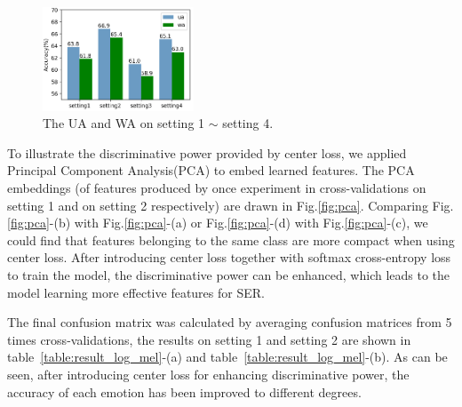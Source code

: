 \documentclass{article}
\begin{document}
\begin{figure}[htb]
	\begin{minipage}[c]{0.55\linewidth}
		\centerline{\includegraphics[width=4.5cm]{fig6}}
	\end{minipage}
	\begin{minipage}[c]{0.36\linewidth}
	\end{minipage}
	\caption{The UA and WA on setting 1 $\sim$ setting 4.}
	\label{fig:setting1-4}

\end{figure}

To illustrate the discriminative power provided by center loss, we applied Principal Component Analysis({PCA}) to embed learned features. The PCA embeddings (of features produced by once experiment in cross-validations on setting 1 and on setting 2 respectively) are drawn in Fig.\ref{fig:pca}. Comparing Fig.\ref{fig:pca}-(b) with Fig.\ref{fig:pca}-(a) or Fig.\ref{fig:pca}-(d) with Fig.\ref{fig:pca}-(c), we could find that features belonging to the same class are more compact when using center loss. After introducing center loss together with softmax cross-entropy loss to train the model, the discriminative power can be enhanced, which leads to the model learning more effective features for SER.

The final confusion matrix was calculated by averaging confusion matrices from 5 times cross-validations, the results on setting 1 and setting 2 are shown in table~\ref{table:result_log_mel}-(a) and table~\ref{table:result_log_mel}-(b). As can be seen, after introducing center loss for enhancing discriminative power, the accuracy of each emotion has been improved to different degrees.
\end{document}
